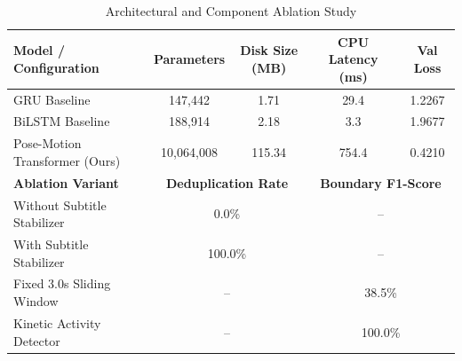 \begin{table}[h]
\centering
\caption{Architectural and Component Ablation Study}
\label{tab:ablation_study}
\begin{tabular}{lcccc}
\hline
\textbf{Model / Configuration} & \textbf{Parameters} & \textbf{Disk Size (MB)} & \textbf{CPU Latency (ms)} & \textbf{Val Loss} \\
\hline
GRU Baseline & 147,442 & 1.71 & 29.4 & 1.2267 \\
BiLSTM Baseline & 188,914 & 2.18 & 3.3 & 1.9677 \\
Pose-Motion Transformer (Ours) & 10,064,008 & 115.34 & 754.4 & 0.4210 \\
\hline
\textbf{Ablation Variant} & \multicolumn{2}{c}{\textbf{Deduplication Rate}} & \multicolumn{2}{c}{\textbf{Boundary F1-Score}} \\
\hline
Without Subtitle Stabilizer & \multicolumn{2}{c}{0.0\%} & \multicolumn{2}{c}{--} \\
With Subtitle Stabilizer & \multicolumn{2}{c}{100.0\%} & \multicolumn{2}{c}{--} \\
Fixed 3.0s Sliding Window & \multicolumn{2}{c}{--} & \multicolumn{2}{c}{38.5\%} \\
Kinetic Activity Detector & \multicolumn{2}{c}{--} & \multicolumn{2}{c}{100.0\%} \\
\hline
\end{tabular}
\end{table}
